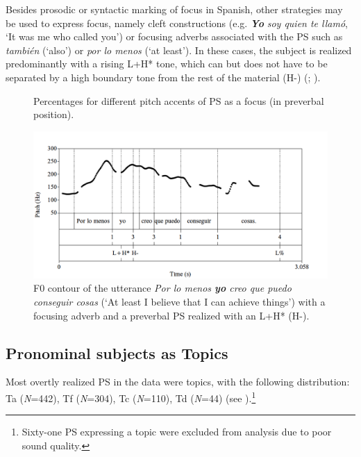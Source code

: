 \documentclass[output=paper]{langsci/langscibook}
\begin{document}
Besides prosodic or syntactic marking of focus in Spanish, other strategies may be used to express focus, namely cleft constructions (e.g. \textbf{\textit{Yo}} \textit{soy quien te llamó}, ‘It was me who called you’) or focusing adverbs associated with the PS such as \textit{también} (‘also’)  or \textit{por lo menos} (‘at least’). In these cases, the subject is realized predominantly with a rising L+H* tone, which can but does not have to be separated by a high boundary tone from the rest of the material (H-) (; ). 

\begin{figure}
\caption{Percentages for different pitch accents of PS as a focus (in preverbal position).}
\label{fig:pes:11}
\end{figure}

  
\begin{figure}
\includegraphics[width=\textwidth]{figures/pes-img12.png}
\caption{F0 contour of the utterance \textit{Por lo menos \textbf{yo} creo que puedo conseguir cosas} (‘At least I believe that I can achieve things’) with a focusing adverb and a preverbal PS realized with an L+H* (H-).\label{fig:pes:12}}
\end{figure}

\subsection{Pronominal subjects as Topics} 
\label{sec:pes:4.2}
Most overtly realized PS in the data were topics, with the following distribution: Ta (\textit{N}=442), Tf (\textit{N}=304), Tc (\textit{N}=110), Td (\textit{N}=44) (see ).\footnote{Sixty-one PS expressing a topic were excluded from analysis due to poor sound quality.}\largerpage[-1]
\end{document}
